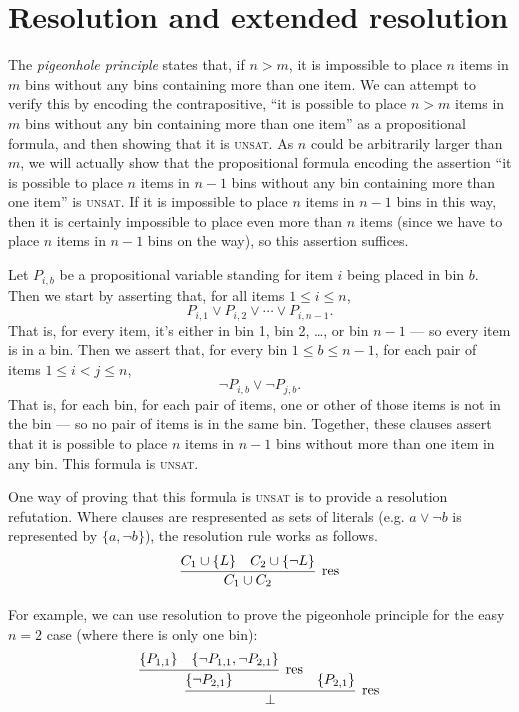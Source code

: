 \documentclass[proof,pdftex,11pt,a4,titlepage]{article}
\newcommand{\unsat}{\textsc{unsat}}
\begin{document}
\section{Resolution and extended resolution}

The \emph{pigeonhole principle} states that, if $n > m$, it is impossible to place $n$ items in $m$ bins without any bins containing more than one item. We can attempt to verify this by encoding the contrapositive, ``it is possible to place $n>m$ items in $m$ bins without any bin containing more than one item'' as a propositional formula, and then showing that it is \unsat. As $n$ could be arbitrarily larger than $m$, we will actually show that the propositional formula encoding the assertion ``it is possible to place $n$ items in $n-1$ bins without any bin containing more than one item'' is \unsat. If it is impossible to place $n$ items in $n-1$ bins in this way, then it is certainly impossible to place even more than $n$ items (since we have to place $n$ items in $n-1$ bins on the way), so this assertion suffices.

Let $P_{i,b}$ be a propositional variable standing for item $i$ being placed in bin $b$. Then we start by asserting that, for all items $1 \leq i \leq n$,
\[P_{i,1} \vee P_{i,2} \vee \cdots \vee P_{i,n-1}.\]
That is, for every item, it's either in bin 1, bin 2, \dots, or bin $n-1$ --- so every item is in a bin. Then we assert that, for every bin $1 \leq b \leq n-1$, for each pair of items $1 \leq i < j \leq n$,
\[\neg P_{i,b} \vee \neg P_{j,b}.\]
That is, for each bin, for each pair of items, one or other of those items is not in the bin --- so no pair of items is in the same bin. Together, these clauses assert that it is possible to place $n$ items in $n-1$ bins without more than one item in any bin. This formula is \unsat.

One way of proving that this formula is \unsat{} is to provide a resolution refutation. Where clauses are respresented as sets of literals (e.g. $a \vee \neg b$ is represented by $\{a, \neg b\}$), the resolution rule works as follows.\[
\infer[\mathrm{res}]{C_1 \cup C_2}{
  C_1 \cup \{L\}
  &
  C_2 \cup \{\neg L\}
}
\]

For example, we can use resolution to prove the pigeonhole principle for the easy $n = 2$ case (where there is only one bin):\[
\infer[\mathrm{res}]{\bot}{
  \infer[\mathrm{res}]{\{\neg P_{2,1}\}}{
    \{P_{1,1}\}
    &
    \{\neg P_{1,1}, \neg P_{2,1}\}
  }
  &
  \{P_{2,1}\}
}
\]
\end{document}
